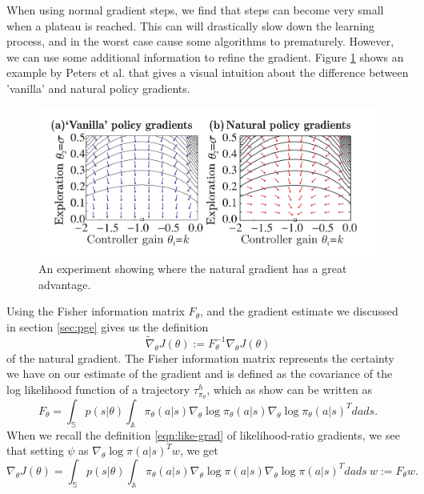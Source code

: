 When using normal gradient steps, we find that steps can become very small when a plateau is reached. 
This can will drastically slow down the learning process, and in the worst case cause some algorithms to prematurely. 
However, we can use some additional information to refine the gradient. 
Figure \ref{fig:nat-grad-adv} shows an example by Peters et al. \cite{Peters_IICHR_2003} that gives a visual intuition about the difference between 'vanilla' and natural policy gradients. 

\begin{figure}
  \includegraphics[width=\textwidth]{nat-grad-adv}
  \caption{An experiment showing where the natural gradient has a great advantage. \cite{Peters_IICHR_2003} }\label{fig:nat-grad-adv}
\end{figure}

Using the Fisher information matrix $F_\theta$, and the gradient estimate we discussed in section \ref{sec:pge} gives us the definition
\begin{equation}
  \widetilde{\nabla}_\theta J(\theta) := F^{-1}_\theta \nabla_\theta J(\theta)
  \label{eqn:nat-grad}
\end{equation}
of the natural gradient. 
The Fisher information matrix represents the certainty we have on our estimate of the gradient and is defined as the covariance of the log likelihood function of a trajectory $\tau_{\pi_\theta}^h$, which as \cite{4863} show can be written as 
\begin{equation}
  F_\theta = \int_\mathbb{S} p(s|\theta) \int_\mathbb{A} \pi_\theta(a|s) \nabla_\theta \log{\pi_\theta(a|s)} \nabla_\theta \log{\pi_\theta(a|s)}^T dads.
  \label{eqn:F}
\end{equation}
When we recall the definition \eqref{eqn:like-grad} of likelihood-ratio gradients, we see that setting $\psi$ as $\nabla_\theta \log \pi(a|s)^T w$, we get
\begin{equation}
  \nabla_\theta J(\theta) = \int_\mathbb{S} {p(s|\theta) \int_\mathbb{A} \pi_\theta(a|s) \nabla_\theta \log \pi(a|s) {\nabla_\theta \log \pi(a|s)}^T dads}\ w := F_\theta w.
  \label{eqn:J-equals-F}
\end{equation}

